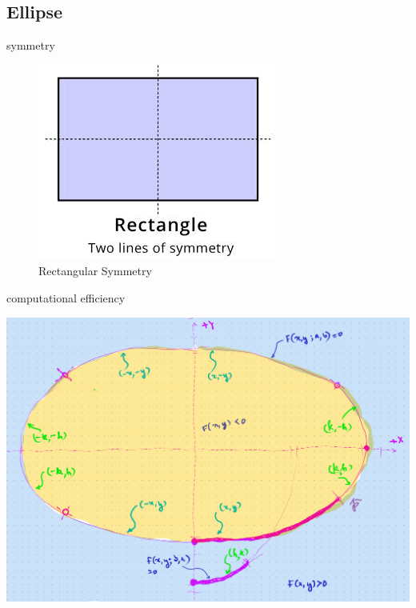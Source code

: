\documentclass[aspectratio=169,xcolor={dvipsnames,svgnames}]{beamer}
\begin{document}
\subsection{Ellipse}
\label{sec:org076b752}

\begin{frame}[label={sec:org903343a}]{symmetry}
\begin{figure}[htbp]
\centering
\includegraphics[width=.9\linewidth]{images/rect-symmetry.png}
\caption{Rectangular Symmetry}
\end{figure}
\end{frame}

\begin{frame}[label={sec:org9b01c26}]{computational efficiency}
\begin{center}
\includegraphics[width=.9\linewidth]{images/2024-09-05-Note-15-30_annotated.png}
\end{center}
\end{frame}
\end{document}
